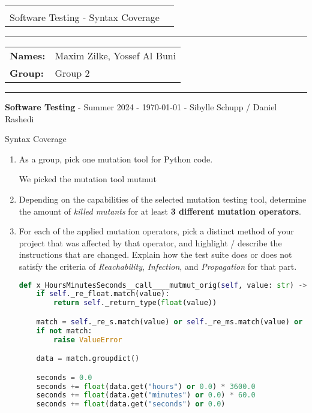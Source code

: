 \documentclass[a4paper]{scrreprt}
\newcommand{\baseinfo}[5]{
  \begin{center}
    \begin{tabular}{p{15cm}r}
      \vspace{-4.5pt}{ \Large \bfseries #1} & \multirow{2}{*}{} \\[0.4cm]
      #2 & \\[0.5cm]
    \end{tabular}
  \end{center}
  \vspace{-18pt}\hrule\vspace{6pt}
  \begin{tabular}{ll}
    \textbf{Names:} & #4\\
    \textbf{Group:} & #5\\
  \end{tabular}
  \vspace{4pt}\hrule\vspace{2pt}
  \footnotesize \textbf{Software Testing} \hfil - \hfil Summer 2024 \hfil - \hfil #3 \hfil - \hfil Sibylle Schupp / Daniel Rashedi \hfil \\
}
\newcounter{question}
\newcommand{\projectinfo}[4]{\baseinfo{Project Task 05 - Submission Sheet}{#1}{#2}{#3}{#4}}
\newcommand{\name}{Maxim Zilke, Yossef Al Buni}
\newcommand{\group}{Group 2}
\begin{document}
\projectinfo{Software Testing - Syntax Coverage\small}{\today}{\name}{\group}

\addtocounter{question}{4}


\begin{question}{Syntax Coverage}
  \begin{enumerate}[topsep=0pt, leftmargin=*]

    \item As a group, pick one mutation tool for Python code.
          \begin{answer}
            We picked the mutation tool mutmut 
          \end{answer}

    \item Depending on the capabilities of the selected mutation testing tool, determine the amount of \textit{killed mutants} for at least \textbf{3 different mutation operators}.
          \begin{answer}
            
          \end{answer}

    \item For each of the applied mutation operators, pick a distinct method of your project that was affected by that operator, and highlight / describe the instructions that are changed. Explain how the test suite does or does not satisfy the criteria of \textit{Reachability}, \textit{Infection}, and \textit{Propagation} for that part.
          \begin{answer}


\begin{lstlisting}[language=Python, caption={mutated tests for \texttt{\_HoursMinutesSeconds\_\_call\_\_} by Maxim Zilke}, label={lst:hoursminutes-call}]
def x_HoursMinutesSeconds__call____mutmut_orig(self, value: str) -> _THMS:
    if self._re_float.match(value):
        return self._return_type(float(value))

    match = self._re_s.match(value) or self._re_ms.match(value) or self._re_hms.match(value)
    if not match:
        raise ValueError

    data = match.groupdict()

    seconds = 0.0
    seconds += float(data.get("hours") or 0.0) * 3600.0
    seconds += float(data.get("minutes") or 0.0) * 60.0
    seconds += float(data.get("seconds") or 0.0)


\end{lstlisting}
\end{answer}
\end{enumerate}
\end{question}
\end{document}
